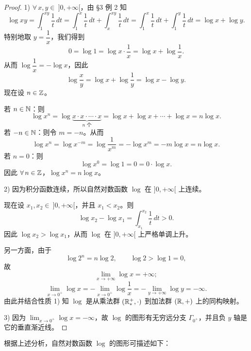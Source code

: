 \begin{proof}

	1) \(\forall\,x,y\in\ ]0,+\infty[\)，由 §3 例 2 知
	\[
	\log xy=\int_1^{xy}\frac1t\,dt=\int_1^x\frac1t\,dt+\int_x^{xy}\frac1t\,dt=\int_1^x\frac1t\,dt+\int_1^y\frac1t\,dt=\log x+\log y.
	\]
	特别地取 \(y=\dfrac1x\)，我们得到
	\[
	0=\log1=\log x\cdot\frac1x=\log x+\log\frac1x.
	\]
	从而 \(\log\dfrac1x=-\log x\)，因此
	\[
	\log\frac xy=\log x+\log\frac1y=\log x-\log y.
	\]
	现在设 \(n\in\mathbb{Z}\)。

	若 \(n\in\mathbb{N}\)：则
	\[
	\log x^n=\log\underbrace{x\cdot x\cdot\cdots\cdot x}_{n\text{ 个}}=\log x+\log x+\cdots+\log x=n\log x.
	\]
	若 \(-n\in\mathbb{N}\)：则令 \(m=-n\)。从而
	\[
	\log x^n=\log x^{-m}=\log\frac1{x^m}=-\log x^m=-m\log x=n\log x.
	\]
	若 \(n=0\)：则
	\[
	\log x^0=\log1=0=0\cdot\log x.
	\]
	因此 \(\forall\,n\in\mathbb{Z}\)，\(\log x^n=n\log x\)。

	2) 因为积分函数连续，所以自然对数函数 \(\log\) 在 \(]0,+\infty[\) 上连续。

	现在设 \(x_1,x_2\in\ ]0,+\infty[\)，并且 \(x_1<x_2\)。则
	\[
	\log x_2-\log x_1=\int_{x_1}^{x_2}\frac1t\,dt>0.
	\]
	因此 \(\log x_2>\log x_1\)，从而 \(\log\) 在 \(]0,+\infty[\) 上严格单调上升。

	另一方面，由于
	\[
	\log2^n=n\log2,\qquad \log2>\log1=0,
	\]
	故
	\[
	\lim_{x\to+\infty}\log x=+\infty;
	\]
	\[
	\lim_{x\to0^+}\log x=-\lim_{x\to0^+}\log\frac1x=-\lim_{y\to+\infty}\log y=-\infty.
	\]
	由此并结合性质 1) 知 \(\log\) 是从乘法群 \((\mathbb{R}_*^+,\cdot)\) 到加法群 \((\mathbb{R},+)\) 上的同构映射。

	3) 因为 \(\lim_{x\to0^+}\log x=-\infty\)，故 \(\log\) 的图形有无穷远分支 \(\Gamma_{0^+}\)，并且负 \(y\) 轴是它的垂直渐近线。

\end{proof}

根据上述分析，自然对数函数 \(\log\) 的图形可描述如下：

\begin{figure}[htbp]
	\centering
	\caption{}
	\label{fig:5-10}
\end{figure}

